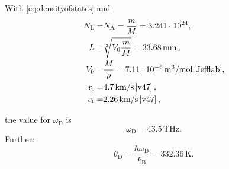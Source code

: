 With \eqref{eq:densityofstates} and
\begin{align*}
    N_\text{L} =& N_\text{A} = \dfrac{m}{M} =  3.241 \cdot 10^{24},                                 \\
    L          =& \sqrt[3]{V_0 \dfrac{m}{M} } = 33.68 \, \text{mm} \, ,              \\
    V_0        =& \dfrac{M}{\rho} = 7.11 \cdot 10^{-6} \, \text{m}^3/\text{mol} \, \text{\cite{Jefflab}},  \\
    v_\text{l}        =& 4.7 \, \text{km/s} \,                                             \text{\cite{v47}}\,,                            \\
    v_\text{t}        =& 2.26 \, \text{km/s} \,                                            \text{\cite{v47}}\,,
\end{align*}

the value for $\omega_\text{D}$ is 
\begin{equation*}
    \omega_\text{D} = 43.5 \, \unit{\tera\hertz}.
    \label{eq:debye_freq}
\end{equation*}
Further:
\begin{equation*}
    \theta_\text{D} = \dfrac{\hbar \omega_\text{D}}{k_\text{B}} = 332.36 \, \unit{\kelvin}.
\end{equation*}

